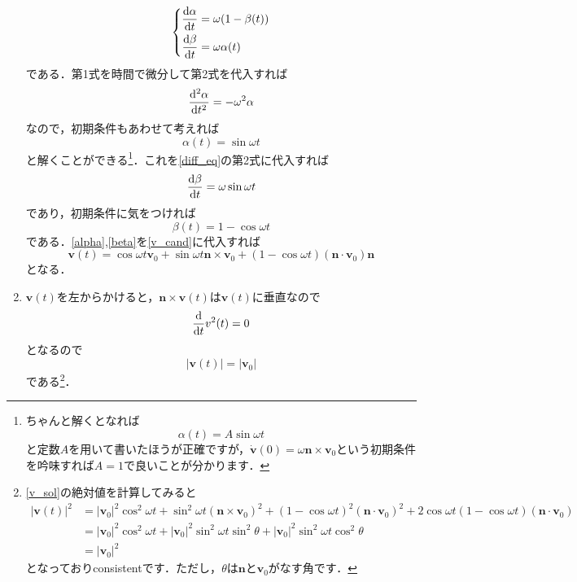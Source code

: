 \documentclass[a4paper,pdflatex,ja=standard]{bxjsarticle}
\begin{document}
\begin{enumerate}
  \begin{equation}
    \left\{
      \begin{alignedat}{1}
        \dv{\alpha}{t}
        &=
        \omega(1-\beta(t))
        \\
        \dv{\beta}{t}
        &=
        \omega\alpha(t)
      \end{alignedat}
    \right.
    \label{diff_eq}
  \end{equation}
  である．第1式を時間で微分して第2式を代入すれば
  \begin{equation}
    \dv[2]{\alpha}{t}
    =
    -\omega^2
    \alpha
  \end{equation}
  なので，初期条件もあわせて考えれば
  \begin{equation}
    \alpha(t)
    =
    \sin\omega t
    \label{alpha}
  \end{equation}
  と解くことができる\footnote{
    ちゃんと解くとなれば
    $$
    \alpha(t)
    =
    A\sin\omega t
    $$
    と定数$A$を用いて書いたほうが正確ですが，$\dot{\bm{v}}(0)=\omega\bm{n}\times\bm{v}_{0}$という初期条件を吟味すれば$A=1$で良いことが分かります．
  }．これを\eqref{diff_eq}の第2式に代入すれば
  \begin{equation}
    \dv{\beta}{t}
    =
    \omega\sin\omega t
  \end{equation}
  であり，初期条件に気をつければ
  \begin{equation}
    \beta(t)
    =
    1-\cos\omega t
    \label{beta}
  \end{equation}
  である．\eqref{alpha},\eqref{beta}を\eqref{v_cand}に代入すれば
  \begin{equation}
    \bm{v}(t)
    =
    \cos\omega t\bm{v}_{0}
    +
    \sin\omega t\bm{n}\times\bm{v}_{0}
    +
    (1-\cos\omega t)(\bm{n}\cdot\bm{v}_{0})\bm{n}
    \label{v_sol}
  \end{equation}  
  となる．

  \item 
  $\bm{v}(t)$を左からかけると，$\bm{n}\times\bm{v}(t)$は$\bm{v}(t)$に垂直なので
  \begin{equation}
    \dv{}{t}{v^2(t)}
    =
    0
  \end{equation}
  となるので
  \begin{equation}
    |\bm{v}(t)|
    =
    |\bm{v}_{0}|
  \end{equation}
  である\footnote{
    \eqref{v_sol}の絶対値を計算してみると
    \begin{align}
      |\bm{v}(t)|^2
      &=
      |\bm{v}_{0}|^2\cos^2\omega t
      +
      \sin^2\omega t(\bm{n}\times\bm{v}_{0})^2
      +
      (1-\cos\omega t)^2(\bm{n}\cdot\bm{v}_{0})^2
      +
      2\cos\omega t(1-\cos\omega t)(\bm{n}\cdot\bm{v}_{0})
      \nonumber
      \\
      &=
      |\bm{v}_{0}|^2\cos^2\omega t
      +
      |\bm{v}_{0}|^2\sin^2\omega t\sin^2\theta
      +
      |\bm{v}_{0}|^2\sin^2\omega t\cos^2 \theta
      \nonumber
      \\
      &=
      |\bm{v}_{0}|^2
      \nonumber
    \end{align}
    となっておりconsistentです．ただし，$\theta$は$\bm{n}$と$\bm{v}_{0}$がなす角です．
  }．


\end{enumerate}
\end{document}
